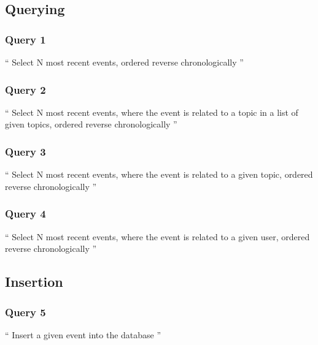 \subsection{Querying}
\label{subsec:querying}

\subsubsection{Query 1}
\label{subsubsec:query-1}

``
Select N most recent events, ordered reverse chronologically
''

\subsubsection{Query 2}
\label{subsubsec:query-2}

``
Select N most recent events, where the event is related to a topic in a list of given topics, ordered reverse chronologically
''

\subsubsection{Query 3}
\label{subsubsec:query-3}

``
Select N most recent events, where the event is related to a given topic, ordered reverse chronologically
''

\subsubsection{Query 4}
\label{subsubsec:query-4}

``
Select N most recent events, where the event is related to a given user, ordered reverse chronologically
''

\subsection{Insertion}
\label{subsec:insertion}

\subsubsection{Query 5}
\label{subsubsec:query-5}

``
Insert a given event into the database
''
